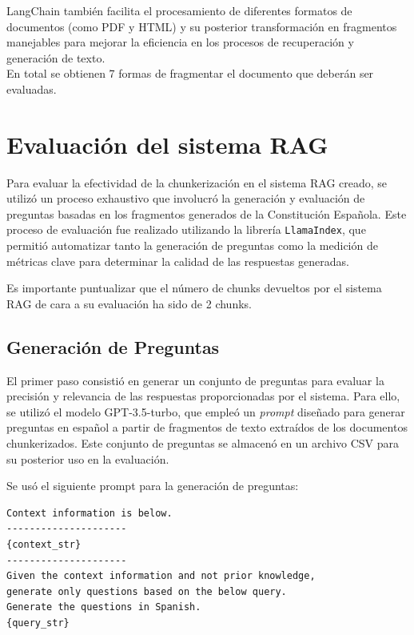 LangChain también facilita el procesamiento de diferentes formatos de documentos (como PDF y HTML) y su posterior transformación en fragmentos manejables para mejorar la eficiencia en los procesos de recuperación y generación de texto.\\

En total se obtienen 7 formas de fragmentar el documento que deberán ser evaluadas.


\section{Evaluación del sistema RAG}

Para evaluar la efectividad de la chunkerización en el sistema RAG creado, se utilizó un proceso exhaustivo que involucró la generación y evaluación de preguntas basadas en los fragmentos generados de la Constitución Española. Este proceso de evaluación fue realizado utilizando la librería \texttt{LlamaIndex}, que permitió automatizar tanto la generación de preguntas como la medición de métricas clave para determinar la calidad de las respuestas generadas.

Es importante puntualizar que el número de chunks devueltos por el sistema RAG de cara a su evaluación ha sido de 2 chunks.

\subsection{Generación de Preguntas}

El primer paso consistió en generar un conjunto de preguntas para evaluar la precisión y relevancia de las respuestas proporcionadas por el sistema. Para ello, se utilizó el modelo GPT-3.5-turbo, que empleó un \textit{prompt} diseñado para generar preguntas en español a partir de fragmentos de texto extraídos de los documentos chunkerizados. Este conjunto de preguntas se almacenó en un archivo CSV para su posterior uso en la evaluación.

Se usó el siguiente prompt para la generación de preguntas:

\begin{verbatim}
Context information is below.
---------------------
{context_str}
---------------------
Given the context information and not prior knowledge,
generate only questions based on the below query.
Generate the questions in Spanish.
{query_str}
\end{verbatim}


